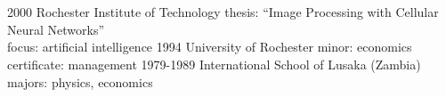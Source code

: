 \documentclass[]{friggeri-cv} %
\begin{document}

\section{{} {} {\normalsize {}~~}}

\begin{entrylist}
\entry
{2000}
{Rochester Institute of Technology}
{}
{thesis: ``Image Processing with Cellular Neural Networks''\\
focus: artificial intelligence}
\entry
{1994}
{University of Rochester}
{}
{minor: economics\\
certificate: management} 
\entry
{1979-1989}
{International School of Lusaka (Zambia)}
{}
{majors: physics, economics}
\end{entrylist}
\end{document}
